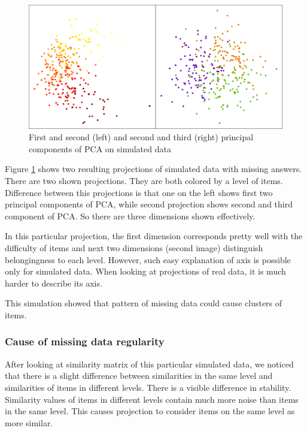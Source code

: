 \documentclass[
  digital, %
  table,   %
  nolof,     %
  nolot,     %
  nocover,
  color,
  final, %
]{fithesis3}
\begin{document}
\begin{figure}
  \includegraphics[width=\textwidth]{img/simulated_missing}
  \caption{First and second (left) and second and third (right) principal components of PCA on simulated data}
  \label{fig:simulated_missing}
\end{figure}

Figure \ref{fig:simulated_missing} shows two resulting projections of simulated data with missing answers. There are two shown projections. They are both colored by a level of items. Difference between this projections is that one on the left shows first two principal components of PCA, while second projection shows second and third component of PCA. So there are three dimensions shown effectively.

In this particular projection, the first dimension corresponds pretty well with the difficulty of items and next two dimensions (second image) distinguish belongingness to each level. However, such easy explanation of axis is possible only for simulated data. When looking at projections of real data, it is much harder to describe its axis.

This simulation showed that pattern of missing data could cause clusters of items.

\subsubsection{Cause of missing data regularity}\label{cause-of-missing-data-regularity}

After looking at similarity matrix of this particular simulated data, we noticed that there is a slight difference between similarities in the same level and similarities of items in different levels. There is a visible difference in stability. Similarity values of items in different levels contain much more noise than items in the same level. This causes projection to consider items on the same level as more similar.
\end{document}
